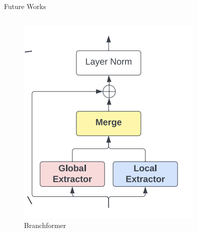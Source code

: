 \documentclass{beamer}
\begin{document}
\begin{frame}{Future Works}
\begin{columns}
    \begin{figure}[htbp]
        \centering
        \includegraphics[width=1\linewidth]{f24.png}
        \caption{Branchformer}
        \label{fig:enter-label}
    \end{figure}


\end{columns}
\end{frame}
\end{document}
